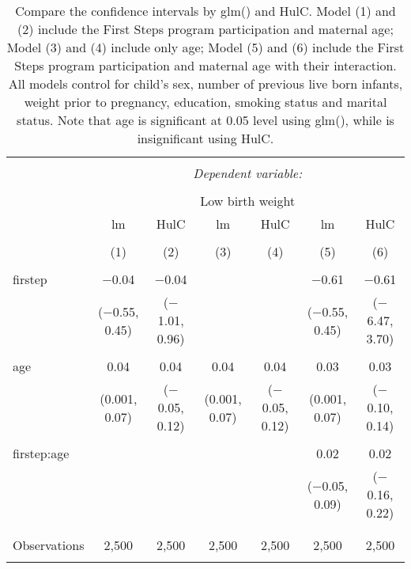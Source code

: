
\begin{table}[!htbp] \centering 
  \caption{Compare the confidence intervals by glm() and HulC. Model (1) and (2) include the First Steps program participation and maternal age; Model (3) and (4) include only age; Model (5) and (6) include the First Steps program participation and maternal age with their interaction. All models control for child’s sex, number of previous live born infants, weight prior to pregnancy, education, smoking status and marital status. Note that age is significant at 0.05 level using glm(), while is insignificant using HulC.} 
  \label{tbl:glm-ci} 
\begin{tabular}{@{\extracolsep{-10pt}}lcccccc} 
\\[-1.8ex]\hline 
\hline \\[-1.8ex] 
 & \multicolumn{6}{c}{\textit{Dependent variable:}} \\ 
\cline{2-7} 
\\[-1.8ex] & \multicolumn{6}{c}{Low birth weight} \\ 
 & lm & HulC & lm & HulC & lm & HulC \\ 
\\[-1.8ex] & (1) & (2) & (3) & (4) & (5) & (6)\\ 
\hline \\[-1.8ex] 
 firstep & $-$0.04 & $-$0.04 &  &  & $-$0.61 & $-$0.61 \\ 
  & ($-$0.55, 0.45) & ($-$1.01, 0.96) &  &  & ($-$0.55, 0.45) & ($-$6.47, 3.70) \\ 
  & & & & & & \\ 
 age & 0.04 & 0.04 & 0.04 & 0.04 & 0.03 & 0.03 \\ 
  & (0.001, 0.07) & ($-$0.05, 0.12) & (0.001, 0.07) & ($-$0.05, 0.12) & (0.001, 0.07) & ($-$0.10, 0.14) \\ 
  & & & & & & \\ 
 firstep:age &  &  &  &  & 0.02 & 0.02 \\ 
  &  &  &  &  & ($-$0.05, 0.09) & ($-$0.16, 0.22) \\ 
  & & & & & & \\ 
\hline \\[-1.8ex] 
Observations & 2,500 & 2,500 & 2,500 & 2,500 & 2,500 & 2,500 \\ 
\hline 
\hline \\[-1.8ex] 
\end{tabular} 
\end{table} 

